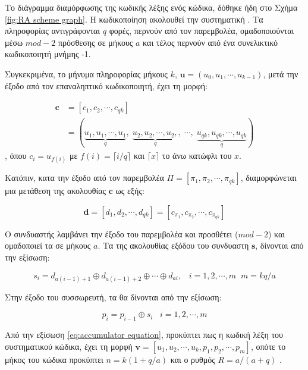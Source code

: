 Το  διάγραμμα διαμόρφωσης της κωδικής λέξης ενός  κώδικα, δόθηκε ήδη στο Σχήμα \ref{fig:RA scheme graph}. Η κωδικοποίηση  ακολουθεί την συστηματική . Τα  πληροφορίας αντιγράφονται $q$ φορές, περνούν από τον παρεμβολέα, ομαδοποιούνται μέσω $mod-2$ πρόσθεσης σε  μήκους $a$ και τέλος περνούν από ένα συνελικτικό κωδικοποιητή μνήμης -1.

Συγκεκριμένα, το μήνυμα πληροφορίας μήκους $k$, $\mathbf{u}=\left(u_0,u_1,\cdots,u_{k-1}\right)$, μετά την έξοδο από τον επαναληπτικό κωδικοποιητή, έχει τη μορφή:

\begin{equation}
\begin{split}
\mathbf{c} &= \left[c_1, c_2, \cdots, c_{qk} \right] \\
&= (\underbrace{u_1,u_1,\cdots,u_1}_q, \; \underbrace{u_2,u_2,\cdots,u_2,}_q, \; \cdots, \; \underbrace{u_{qk},u_{qk},\cdots,u_{qk}}_q)
\end{split}
\end{equation}
, όπου $c_i=u_{f(i)}$ με $f(i)=\lceil i/q \rceil$ και $\lceil x \rceil$ το άνω κατώφλι του $x$.

Κατόπιν, κατα την έξοδο από τον παρεμβολέα $\Pi=[\pi_1,\pi_2,\cdots,\pi_{qk}]$, διαμορφώνεται μια μετάθεση της ακολουθίας $\mathbf{c}$ ως εξής:

\begin{equation*}
\mathbf{d} = \left[d_1, d_2, \cdots, d_{qk} \right] = [c_{\pi_1}, c_{\pi_2}, \cdots, c_{\pi_{qk}}]
\end{equation*}

Ο συνδυαστής λαμβάνει την έξοδο του παρεμβολέα και προσθέτει ($mod-2$) και ομαδοποιεί τα  σε  μήκους $a$. Τα  της ακολουθίας εξόδου του συνδυαστη $\mathbf{s}$, δίνονται από την εξίσωση:

\begin{equation}
s_i=d_{a(i-1)+1}\oplus d_{a(i-1)+2} \oplus \cdots \oplus d_{ai}, \;\;\; i=1,2,\cdots,m\;\;m=kq/a
\label{eq:combiner equation}
\end{equation}

Στην έξοδο του συσσωρευτή, τα  θα δίνονται από την εξίσωση:

\begin{equation}
p_i=p_{i-1}\oplus s_i\;\;\; i=1,2,\cdots,m
\label{eq:accumulator equation}
\end{equation}

Από την εξίσωση \ref{eq:accumulator equation}, προκύπτει πως η κωδική λέξη του συστηματικού  κώδικα, έχει τη μορφή $\mathbf{v}=[u_1, u_2,\cdots,u_k,p_1,p_2,\cdots,p_m]$, οπότε το μήκος του κώδικα προκύπτει $n=k(1+q/a)$ και ο ρυθμός $R=a/(a+q)$ \cite{johnson2009iterative}.

